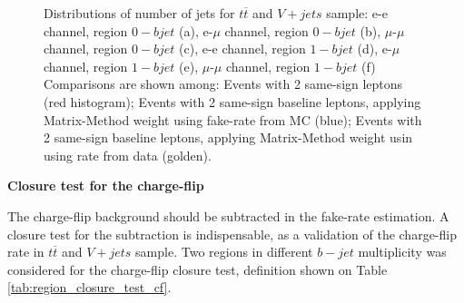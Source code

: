 \begin{figure}[!htb]
\begin{center}
\end{center}
\caption{\label{fig:fake_closure_test}
Distributions of number of jets for $t\overline{t}$ and $V+jets$ sample: e-e channel, region $0-bjet$ (a),
e-$\mu$ channel, region $0-bjet$ (b),
$\mu$-$\mu$ channel, region $0-bjet$ (c),
e-e channel, region $1-bjet$ (d),
e-$\mu$ channel, region $1-bjet$ (e),
$\mu$-$\mu$ channel, region $1-bjet$ (f)
Comparisons are shown among: Events with 2 same-sign leptons (red histogram);
Events with 2 same-sign baseline leptons, applying Matrix-Method weight using fake-rate from MC (blue);
Events with 2 same-sign baseline leptons, applying Matrix-Method weight usin using rate from data (golden).
}
\end{figure}



\par{\bf Closure test for the charge-flip}

The charge-flip background should be subtracted in the fake-rate estimation.
A closure test for the subtraction is indispensable, as a validation of the charge-flip rate in $t\overline{t}$ and $V+jets$ sample.
Two regions in different $b-jet$ multiplicity was considered for the charge-flip closure test, definition shown on Table \ref{tab:region_closure_test_cf}.

